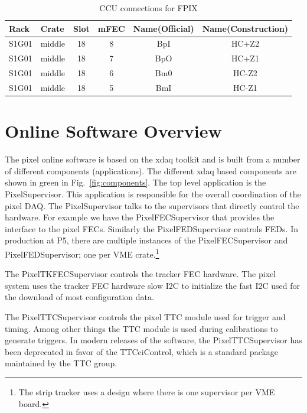 \begin{small}
\begin{table}
\centering
\caption{CCU connections for FPIX}
\label{tab:FpixCCU}
\begin{tabular}{llcccc}
\hline
\hline
Rack   & Crate   & Slot & mFEC & Name(Official) & Name(Construction) \\
\hline
S1G01  &  middle & 18   &  8   & BpI            & HC+Z2 \\
S1G01  &  middle & 18   &  7   & BpO            & HC+Z1 \\
S1G01  &  middle & 18   &  6   & Bm0            & HC-Z2 \\
S1G01  &  middle & 18   &  5   & BmI            & HC-Z1 \\
\hline
\hline
\end{tabular}
\end{table}
\end{small}


\section{Online Software Overview} 
\label{sect:overview}

The pixel online software is based on the xdaq toolkit and is
built from a number of different components (applications). The
different xdaq based components are shown in green in 
Fig.~\ref{fig:components}. The top level application is the 
PixelSupervisor. This application is responsible for the overall
coordination of the pixel DAQ. The PixelSupervisor talks to the
supervisors that directly control the hardware. For example 
we have the PixelFECSupervisor that provides the interface to the
pixel FECs. Similarly the PixelFEDSupervisor controls FEDs. 
In production at P5, there are multiple instances of the PixelFECSupervisor and
PixelFEDSupervisor; one per VME crate.\footnote{The strip tracker
uses a design where there is one supervisor per VME board.}

The PixelTKFECSupervisor controls the tracker FEC hardware. The
pixel system uses the tracker FEC hardware slow I2C to
initialize the fast I2C used for the download of most 
configuration data.

The PixelTTCSupervisor controls the pixel TTC module used for trigger
and timing. Among other things the TTC module is used during
calibrations to generate triggers. In modern releases of the software,
the PixelTTCSupervisor has been deprecated in favor of the
TTCciControl, which is a standard package maintained by the TTC group.

